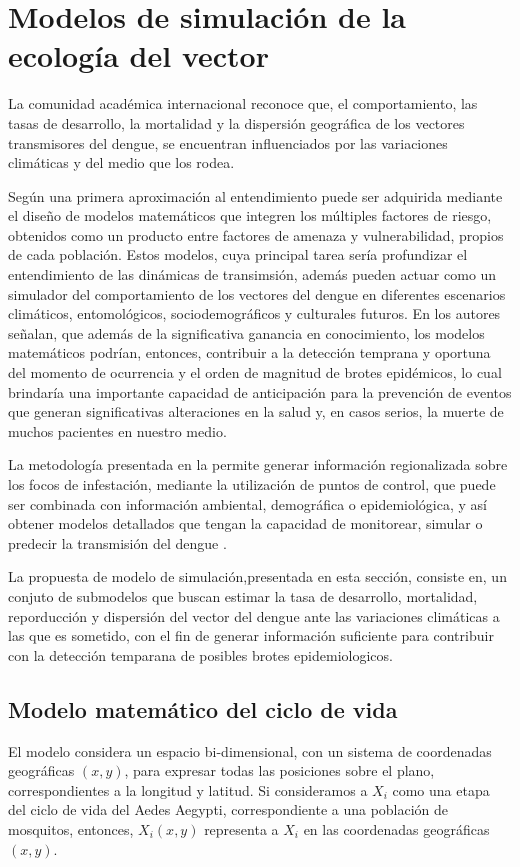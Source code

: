 \section{Modelos de simulación de la ecología del vector}
\label{sec:cap4-modelo-simulacion}

La comunidad académica internacional reconoce que, el comportamiento, las tasas de desarrollo, la
mortalidad y la dispersión geográfica de los vectores transmisores del dengue, se encuentran
influenciados por las variaciones climáticas y del medio que los rodea.

Según \citet{velez2013hacia} una primera aproximación al entendimiento puede ser adquirida
mediante el diseño de modelos matemáticos que integren los múltiples factores de riesgo, obtenidos
como un producto entre factores de amenaza y vulnerabilidad, propios de cada población. Estos
modelos, cuya principal tarea sería profundizar el entendimiento de las dinámicas de transimsión,
además pueden actuar como un simulador del comportamiento de los vectores del dengue en diferentes
escenarios climáticos, entomológicos, sociodemográficos y culturales futuros. En
\citet{velez2013hacia} los autores señalan, que además de la significativa ganancia en
conocimiento, los modelos matemáticos podrían, entonces, contribuir a la detección temprana y
oportuna del momento de ocurrencia y el orden de magnitud de brotes epidémicos, lo cual brindaría
una importante capacidad de anticipación para la prevención de eventos que generan significativas
alteraciones en la salud y, en casos serios, la muerte de muchos pacientes en nuestro medio.

La metodología presentada en la  permite generar información
regionalizada sobre los focos de infestación, mediante la utilización de puntos de control, que
puede ser combinada con información ambiental, demográfica o epidemiológica, y así obtener modelos
detallados que tengan la capacidad de monitorear, simular o predecir la transmisión del dengue
\citet{NINO2011}.

La propuesta de modelo de simulación,presentada en esta sección, consiste en, un conjuto de
submodelos que buscan estimar la tasa de desarrollo, mortalidad, reporducción y dispersión del
vector del dengue ante las variaciones climáticas a las que es sometido, con el fin de generar
información suficiente para contribuir con la detección temparana de posibles brotes
epidemiologicos.

\subsection{Modelo matemático del ciclo de vida}
\label{subsec:cap4-modelo-matematico-ciclo-vida}
El modelo considera un espacio bi-dimensional, con un sistema de coordenadas geográficas $(x,y)$,
para expresar todas las posiciones sobre el plano, correspondientes a la longitud y latitud. Si
consideramos a $X_{i}$ como una etapa del ciclo de vida del Aedes Aegypti, correspondiente a una
población de mosquitos, entonces, $X_{i}(x,y)$ representa a $X_{i}$ en las coordenadas geográficas
$(x,y)$.

